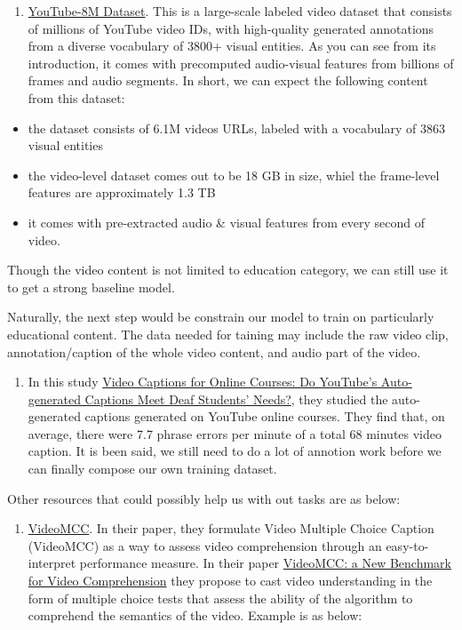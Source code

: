 \documentclass[]{book}
\providecommand{\tightlist}{%
  \setlength{\itemsep}{0pt}\setlength{\parskip}{0pt}}
\theoremstyle{definition}
\theoremstyle{definition}
\theoremstyle{definition}
\theoremstyle{remark}
\begin{document}
\begin{enumerate}
\def\labelenumi{\arabic{enumi}.}
\tightlist
\item
  \href{https://research.google.com/youtube8m/}{YouTube-8M Dataset}.
  This is a large-scale labeled video dataset that consists of millions
  of YouTube video IDs, with high-quality generated annotations from a
  diverse vocabulary of 3800+ visual entities. As you can see from its
  introduction, it comes with precomputed audio-visual features from
  billions of frames and audio segments. In short, we can expect the
  following content from this dataset:
\end{enumerate}

\begin{itemize}
\item
  the dataset consists of 6.1M videos URLs, labeled with a vocabulary of
  3863 visual entities
\item
  the video-level dataset comes out to be 18 GB in size, whiel the
  frame-level features are approximately 1.3 TB
\item
  it comes with pre-extracted audio \& visual features from every second
  of video.
\end{itemize}

Though the video content is not limited to education category, we can
still use it to get a strong baseline model.

Naturally, the next step would be constrain our model to train on
particularly educational content. The data needed for taining may
include the raw video clip, annotation/caption of the whole video
content, and audio part of the video.

\begin{enumerate}
\def\labelenumi{\arabic{enumi}.}
\setcounter{enumi}{1}
\tightlist
\item
  In this study
  \href{http://jofdl.nz/index.php/JOFDL/article/download/255/198}{Video
  Captions for Online Courses: Do YouTube's Auto-generated Captions Meet
  Deaf Students' Needs?}, they studied the auto-generated captions
  generated on YouTube online courses. They find that, on average, there
  were 7.7 phrase errors per minute of a total 68 minutes video caption.
  It is been said, we still need to do a lot of annotion work before we
  can finally compose our own training dataset.
\end{enumerate}

Other resources that could possibly help us with out tasks are as below:

\begin{enumerate}
\def\labelenumi{\arabic{enumi}.}
\setcounter{enumi}{2}
\tightlist
\item
  \href{http://videomcc.org/}{VideoMCC}. In their paper, they formulate
  Video Multiple Choice Caption (VideoMCC) as a way to assess video
  comprehension through an easy-to-interpret performance measure. In
  their paper \href{https://arxiv.org/pdf/1606.07373.pdf}{VideoMCC: a
  New Benchmark for Video Comprehension} they propose to cast video
  understanding in the form of multiple choice tests that assess the
  ability of the algorithm to comprehend the semantics of the video.
  Example is as below:
\end{enumerate}
\end{document}
